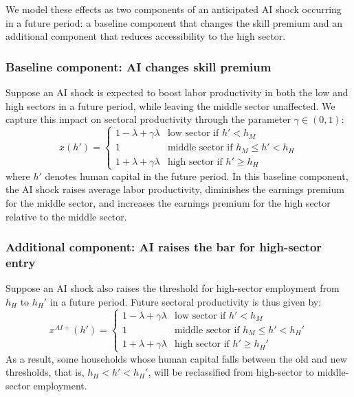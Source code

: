 \documentclass[12pt,english]{article}
\numberwithin{equation}{section}
\begin{document}
\vspace{0.5cm}
\noindent
We model these effects as two components of an anticipated AI shock occurring in a future period: a baseline component that changes the skill premium and an additional component that reduces accessibility to the high sector. 

\subsubsection{Baseline component: AI changes skill premium}
Suppose an AI shock is expected to boost labor productivity in both the low and high sectors in a future period, while leaving the middle sector unaffected. We capture this impact on sectoral productivity through the parameter $\gamma\in(0,1)$:
\begin{equation}
    \label{eq:xAI}
x(h')=\left \{ 
\begin{array}{cl}
1-\lambda + \gamma \lambda & \text{low sector if }h'<h_{M} \\ 
1 & \text{middle sector if }h_{M} \leq h'<h_{H} \\ 
1+\lambda + \gamma \lambda & \text{high sector if }h'\geq h_{H}%
\end{array}%
\right. 
\end{equation}
where $h'$ denotes human capital in the future period. In this baseline component, the AI shock raises average labor productivity, diminishes the earnings premium for the middle sector, and increases the earnings premium for the high sector relative to the middle sector.


\subsubsection{Additional component: AI raises the bar for high-sector entry}
Suppose an AI shock also raises the threshold for high-sector employment from $h_H$ to $h_H'$ in a future period. Future sectoral productivity is thus given by:
\begin{equation}
    \label{eq:xAI_expand}
x^{AI+}(h')=\left\{ 
\begin{array}{cl}
1-\lambda + \gamma \lambda & \text{low sector if }h'<h_{M} \\ 
1 & \text{middle sector if }h_{M} \leq h'<h_{H}' \\ 
1+\lambda + \gamma \lambda & \text{high sector if }h' \geq h_{H}'%
\end{array}%
\right. 
\end{equation}
As a result, some households whose human capital falls between the old and new thresholds, that is, $h_H < h' < h_H'$, will be reclassified from high-sector to middle-sector employment. 
\end{document}

